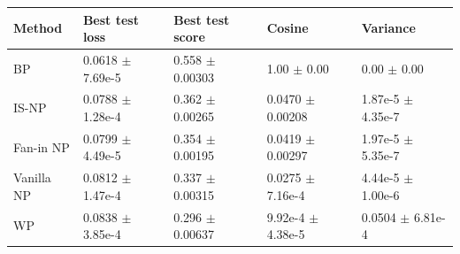 \begin{tabular}{lllll}
\toprule
Method & Best test loss & Best test score & Cosine & Variance \\
\midrule
BP & 0.0618 $\pm$ 7.69e-5 & 0.558 $\pm$ 0.00303 & 1.00 $\pm$ 0.00 & 0.00 $\pm$ 0.00 \\
IS-NP & 0.0788 $\pm$ 1.28e-4 & 0.362 $\pm$ 0.00265 & 0.0470 $\pm$ 0.00208 & 1.87e-5 $\pm$ 4.35e-7 \\
Fan-in NP & 0.0799 $\pm$ 4.49e-5 & 0.354 $\pm$ 0.00195 & 0.0419 $\pm$ 0.00297 & 1.97e-5 $\pm$ 5.35e-7 \\
Vanilla NP & 0.0812 $\pm$ 1.47e-4 & 0.337 $\pm$ 0.00315 & 0.0275 $\pm$ 7.16e-4 & 4.44e-5 $\pm$ 1.00e-6 \\
WP & 0.0838 $\pm$ 3.85e-4 & 0.296 $\pm$ 0.00637 & 9.92e-4 $\pm$ 4.38e-5 & 0.0504 $\pm$ 6.81e-4 \\
\bottomrule
\end{tabular}
